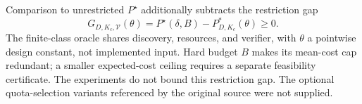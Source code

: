 Comparison to unrestricted $P^\star$ additionally subtracts the restriction gap
$$G_{D,K_c,\mathcal V}(\theta)=P^\star(\delta,B)-P^*_{D,K_c}(\theta)\geq0.$$
The finite-class oracle shares discovery, resources, and verifier, with $\theta$ a pointwise design constant, not implemented input. Hard budget $B$ makes its mean-cost cap redundant; a smaller expected-cost ceiling requires a separate feasibility certificate. The experiments do not bound this restriction gap. The optional quota-selection variants referenced by the original source were not supplied.
